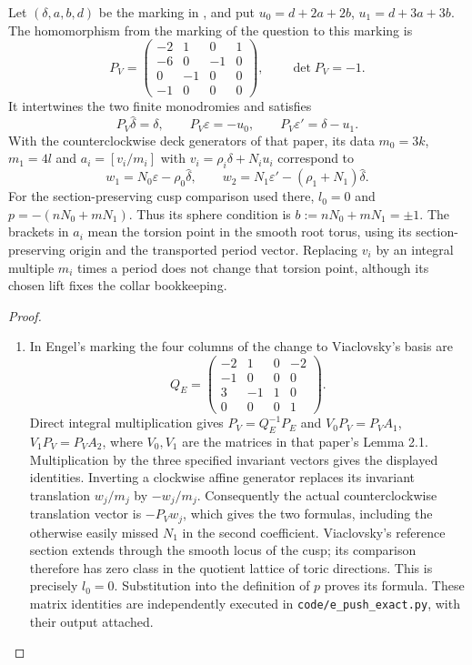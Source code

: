 \begin{proposition}\hypertarget{tag-032R}{}\label{push:src:E.1.1}

Let $(\delta,a,b,d)$ be the marking in
\cite[Section 2, equations (2.1), (2.2), (2.7), (2.11)--(2.12)]{ViaclovskyLog2026},
and put $u_0=d+2a+2b$, $u_1=d+3a+3b$.
The homomorphism from the marking of the question to this marking is
\[
 P_V=\begin{pmatrix}
 -2&1&0&1\\-6&0&-1&0\\0&-1&0&0\\-1&0&0&0
 \end{pmatrix},\qquad \det P_V=-1.
\]
It intertwines the two finite monodromies and satisfies
\[
 P_V\widehat\delta=\delta,\qquad
 P_V\varepsilon=-u_0,\qquad
 P_V\varepsilon'=\delta-u_1.
\]
With the counterclockwise deck generators of that paper, its data
$m_0=3k$, $m_1=4l$ and
$a_i=[v_i/m_i]$ with $v_i=\rho_i\delta+N_i u_i$ correspond to
\[
 w_1=N_0\varepsilon-\rho_0\widehat\delta,
 \qquad
 w_2=N_1\varepsilon'-(\rho_1+N_1)\widehat\delta.
\]
For the section-preserving cusp comparison used there, $l_0=0$ and
$p=-(nN_0+mN_1)$.  Thus its sphere condition is
$b:=nN_0+mN_1=\pm1$.
The brackets in $a_i$ mean the torsion point in the smooth
root torus, using its section-preserving origin and the
transported period vector.  Replacing $v_i$ by an integral
multiple $m_i$ times a period does not change that torsion
point, although its chosen lift fixes the collar bookkeeping.
\end{proposition}


\begin{proof}
\begin{enumerate}[label=\arabic*.,leftmargin=*]
\item In Engel's marking the four columns of the change to Viaclovsky's
basis are
\[
 Q_E=\begin{pmatrix}-2&1&0&-2\\-1&0&0&0\\3&-1&1&0\\0&0&0&1\end{pmatrix}.
\]
Direct integral multiplication gives $P_V=Q_E^{-1}P_E$ and
$V_0P_V=P_VA_1$, $V_1P_V=P_VA_2$, where $V_0,V_1$ are the
matrices in that paper's Lemma 2.1.  Multiplication by the three
specified invariant vectors gives the displayed identities.
Inverting a clockwise affine generator replaces its invariant
translation $w_j/m_j$ by $-w_j/m_j$.  Consequently the actual
counterclockwise translation vector is $-P_Vw_j$, which gives the
two formulas, including the otherwise easily missed $N_1$ in the
second coefficient.  Viaclovsky's reference section extends through
the smooth locus of the cusp; its comparison therefore has zero
class in the quotient lattice of toric directions.  This is precisely
$l_0=0$.  Substitution into the definition of $p$ proves its formula.
These matrix identities are independently executed in
\texttt{code/e\_push\_exact.py}, with their output attached.
\end{enumerate}
\end{proof}